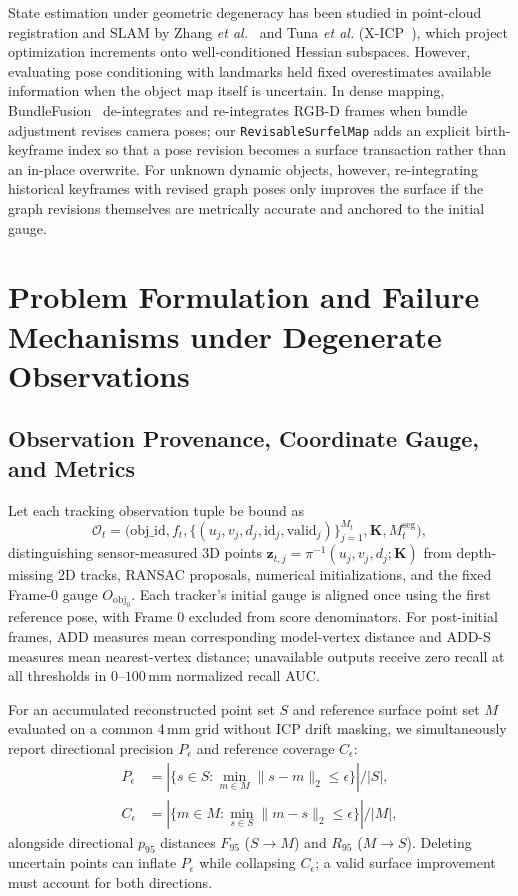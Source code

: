 \documentclass[10pt,journal]{IEEEtran}
\begin{document}
State estimation under geometric degeneracy has been studied in point-cloud registration and SLAM by Zhang \emph{et al.}~\cite{zhang2016degeneracy} and Tuna \emph{et al.} (X-ICP~\cite{xicp}), which project optimization increments onto well-conditioned Hessian subspaces. However, evaluating pose conditioning with landmarks held fixed overestimates available information when the object map itself is uncertain. In dense mapping, BundleFusion~\cite{bundlefusion} de-integrates and re-integrates RGB-D frames when bundle adjustment revises camera poses; our \texttt{RevisableSurfelMap} adds an explicit birth-keyframe index so that a pose revision becomes a surface transaction rather than an in-place overwrite. For unknown dynamic objects, however, re-integrating historical keyframes with revised graph poses only improves the surface if the graph revisions themselves are metrically accurate and anchored to the initial gauge.

\section{Problem Formulation and Failure Mechanisms under Degenerate Observations}
\label{sec:problem}

\subsection{Observation Provenance, Coordinate Gauge, and Metrics}
Let each tracking observation tuple be bound as
\begin{equation}
    \mathcal{O}_t=\big(\text{obj\_id},f_t,\{(u_j,v_j,d_j,\text{id}_j,\text{valid}_j)\}_{j=1}^{M_t},\mathbf{K},M_t^{\mathrm{seg}}\big),
\end{equation}
distinguishing sensor-measured 3D points $\mathbf{z}_{t,j}=\pi^{-1}(u_j,v_j,d_j;\mathbf{K})$ from depth-missing 2D tracks, RANSAC proposals, numerical initializations, and the fixed Frame-0 gauge $O_{\mathrm{obj}_0}$. Each tracker's initial gauge is aligned once using the first reference pose, with Frame 0 excluded from score denominators. For post-initial frames, ADD measures mean corresponding model-vertex distance and ADD-S measures mean nearest-vertex distance; unavailable outputs receive zero recall at all thresholds in $0$--$100\,\mathrm{mm}$ normalized recall AUC.

For an accumulated reconstructed point set $S$ and reference surface point set $M$ evaluated on a common $4\,\mathrm{mm}$ grid without ICP drift masking, we simultaneously report directional precision $P_\epsilon$ and reference coverage $C_\epsilon$:
\begin{align}
    P_\epsilon &= |\{s\in S:\min_{m\in M}\|s-m\|_2\le\epsilon\}|/|S|, \\
    C_\epsilon &= |\{m\in M:\min_{s\in S}\|m-s\|_2\le\epsilon\}|/|M|,
\end{align}
alongside directional $p_{95}$ distances $F_{95}$ ($S\to M$) and $R_{95}$ ($M\to S$). Deleting uncertain points can inflate $P_\epsilon$ while collapsing $C_\epsilon$; a valid surface improvement must account for both directions.
\end{document}
